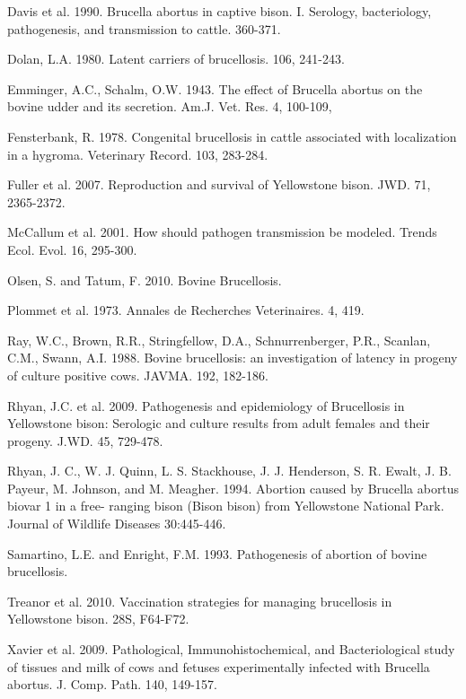 \documentclass[letterpaper,12pt]{article}
\begin{document}
Davis et al. 1990. Brucella abortus in captive bison. I. Serology, bacteriology, pathogenesis, and transmission to cattle. 360-371.

Dolan, L.A. 1980. Latent carriers of brucellosis. 106, 241-243. 

Emminger, A.C., Schalm, O.W. 1943. The effect of Brucella abortus on the bovine udder and its secretion. Am.J. Vet. Res. 4, 100-109, 

Fensterbank, R. 1978. Congenital brucellosis in cattle associated with localization in a hygroma. Veterinary Record. 103, 283-284.

Fuller et al. 2007. Reproduction and survival of Yellowstone bison. JWD. 71, 2365-2372.

McCallum et al. 2001. How should pathogen transmission be modeled. Trends Ecol. Evol. 16, 295-300.

Olsen, S. and Tatum, F. 2010. Bovine Brucellosis.

Plommet et al. 1973. Annales de Recherches Veterinaires. 4, 419. %

Ray, W.C., Brown, R.R., Stringfellow, D.A., Schnurrenberger, P.R., Scanlan, C.M., Swann, A.I. 1988. Bovine brucellosis: an investigation of latency in progeny of culture positive cows. JAVMA. 192, 182-186.

Rhyan, J.C. et al. 2009. Pathogenesis and epidemiology of Brucellosis in Yellowstone bison: Serologic and culture results from adult females and their progeny. J.WD. 45, 729-478.

Rhyan, J. C., W. J. Quinn, L. S. Stackhouse, J. J. Henderson, S. R. Ewalt, J. B. Payeur, M. Johnson, and M. Meagher. 1994. Abortion caused by Brucella abortus biovar 1 in a free- ranging bison (Bison bison) from Yellowstone National Park. Journal of Wildlife Diseases 30:445-446.

Samartino, L.E. and Enright, F.M. 1993. Pathogenesis of abortion of bovine brucellosis. 

Treanor et al. 2010. Vaccination strategies for managing brucellosis in Yellowstone bison. 28S, F64-F72.

Xavier et al. 2009. Pathological, Immunohistochemical, and Bacteriological study of tissues and milk of cows and fetuses experimentally infected with Brucella abortus. J. Comp. Path. 140, 149-157. 
\end{document}

